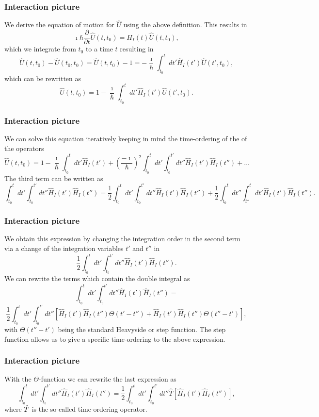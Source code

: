 \frame
{
\frametitle{Interaction picture}
\begin{small}
{\scriptsize
We derive the equation of motion for $\hat{U}$ using the above definition.
This results in
\[
\imath \hbar\frac{\partial }{\partial t}\hat{U}(t,t_0) = \hat{H}_I(t)\hat{U}(t,t_0),
\]
which we integrate from $t_0$ to a time $t$ resulting in
\[
\hat{U}(t,t_0)-\hat{U}(t_0,t_0)=\hat{U}(t,t_0)-1=-\frac{\imath}{\hbar}\int_{t_0}^t dt' \hat{H}_I(t')\hat{U}(t',t_0),
\]
which can be rewritten as
\[
\hat{U}(t,t_0)=1-\frac{\imath}{\hbar}\int_{t_0}^t dt' \hat{H}_I(t')\hat{U}(t',t_0).
\]
}
\end{small}
}
\frame
{
\frametitle{Interaction picture}
\begin{small}
{\scriptsize
We can solve this equation iteratively keeping in mind the time-ordering of the of the operators
\[
\hat{U}(t,t_0)=1-\frac{\imath}{\hbar}\int_{t_0}^t dt' \hat{H}_I(t')+\left(\frac{-\imath}{\hbar}\right)^2\int_{t_0}^t dt'\int_{t_0}^{t'} dt'' \hat{H}_I(t')\hat{H}_I(t'')+\dots
\]
The third term can be written as 
\[
\int_{t_0}^t dt'\int_{t_0}^{t'} dt'' \hat{H}_I(t')\hat{H}_I(t'')=
\frac{1}{2}\int_{t_0}^t dt'\int_{t_0}^{t'} dt'' \hat{H}_I(t')\hat{H}_I(t'')
+\frac{1}{2}\int_{t_0}^t dt''\int_{t''}^{t} dt' \hat{H}_I(t')\hat{H}_I(t'').
\]
}
\end{small}
}
\frame
{
\frametitle{Interaction picture}
\begin{small}
{\scriptsize
We obtain this expression by changing the integration order in the second term
via a change of the integration variables $t'$ and $t''$  in 
\[
\frac{1}{2}\int_{t_0}^t dt'\int_{t_0}^{t'} dt'' \hat{H}_I(t')\hat{H}_I(t'').
\]
We can rewrite the terms which contain the double integral as
\[
\int_{t_0}^t dt'\int_{t_0}^{t'} dt'' \hat{H}_I(t')\hat{H}_I(t'')=\]
\[
\frac{1}{2}\int_{t_0}^t dt'\int_{t_0}^{t'} dt''\left[\hat{H}_I(t')\hat{H}_I(t'')\Theta(t'-t'')
+\hat{H}_I(t')\hat{H}_I(t'')\Theta(t''-t')\right],
\]
with $\Theta(t''-t')$ being the standard Heavyside or step function. The step function allows us to give a specific time-ordering to the above expression.
}
\end{small}
}
\frame
{
\frametitle{Interaction picture}
\begin{small}
{\scriptsize
With the $\Theta$-function we can rewrite the last expression as 
\[
\int_{t_0}^t dt'\int_{t_0}^{t'} dt'' \hat{H}_I(t')\hat{H}_I(t'')=
\frac{1}{2}\int_{t_0}^t dt'\int_{t_0}^{t'} dt''\hat{T}\left[\hat{H}_I(t')\hat{H}_I(t'')\right],
\]
where $\Hat{T}$ is the so-called time-ordering operator. 
}
\end{small}
}
